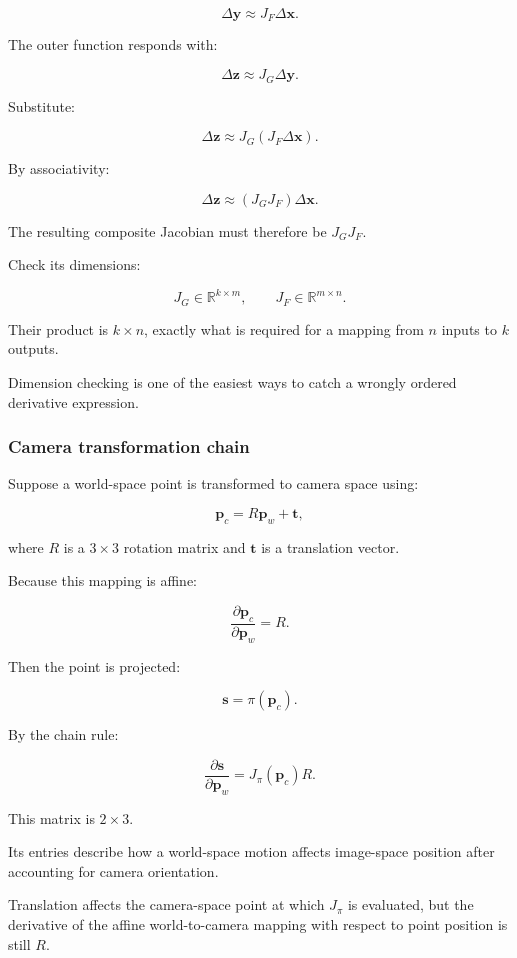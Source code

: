 \[
\Delta\mathbf y\approx J_F\Delta\mathbf x.
\]

The outer function responds with:

\[
\Delta\mathbf z\approx J_G\Delta\mathbf y.
\]

Substitute:

\[
\Delta\mathbf z \approx J_G(J_F\Delta\mathbf x).
\]

By associativity:

\[
\boxed{ \Delta\mathbf z \approx(J_GJ_F)\Delta\mathbf x }.
\]

The resulting composite Jacobian must therefore be \(J_GJ_F\).

Check its dimensions:

\[
J_G\in\mathbb R^{k\times m}, \qquad J_F\in\mathbb R^{m\times n}.
\]

Their product is \(k\times n\), exactly what is required for a mapping from \(n\) inputs to \(k\) outputs.

Dimension checking is one of the easiest ways to catch a wrongly ordered derivative expression.

\subsubsection{Camera transformation chain}\label{02-foundations-ii-ch021-camera-transformation-chain}

Suppose a world-space point is transformed to camera space using:

\[
\mathbf p_c=R\mathbf p_w+\mathbf t,
\]

where \(R\) is a \(3\times3\) rotation matrix and \(\mathbf t\) is a translation vector.

Because this mapping is affine:

\[
\frac{\partial\mathbf p_c}{\partial\mathbf p_w}=R.
\]

Then the point is projected:

\[
\mathbf s=\pi(\mathbf p_c).
\]

By the chain rule:

\[
\boxed{ \frac{\partial\mathbf s}{\partial\mathbf p_w} = J_\pi(\mathbf p_c)R }.
\]

This matrix is \(2\times3\).

Its entries describe how a world-space motion affects image-space position after accounting for camera orientation.

Translation affects the camera-space point at which \(J_\pi\) is evaluated, but the derivative of the affine world-to-camera mapping with respect to point position is still \(R\).

